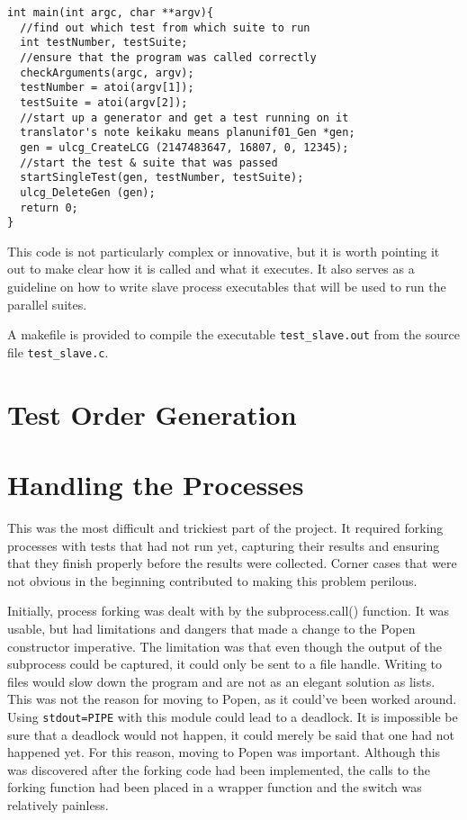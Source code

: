 \begin{verbatim}
int main(int argc, char **argv){
  //find out which test from which suite to run
  int testNumber, testSuite;
  //ensure that the program was called correctly
  checkArguments(argc, argv);
  testNumber = atoi(argv[1]);
  testSuite = atoi(argv[2]);
  //start up a generator and get a test running on it 
  translator's note keikaku means planunif01_Gen *gen;
  gen = ulcg_CreateLCG (2147483647, 16807, 0, 12345);
  //start the test & suite that was passed 
  startSingleTest(gen, testNumber, testSuite);
  ulcg_DeleteGen (gen);
  return 0;
}     
\end{verbatim}

This code is not particularly complex or innovative, but it is worth pointing it out to make clear how it is called and what it executes. It also serves as a guideline on how to write slave process executables that will be used to run the parallel suites.

A makefile is provided to compile the executable \texttt{test\_slave.out} from the source file \texttt{test\_slave.c}.

\section{Test Order Generation}

\section{Handling the Processes}
This was the most difficult and trickiest part of the project. It required forking processes with tests that had not run yet, capturing their results and ensuring that they finish properly before the results were collected. Corner cases that were not obvious in the beginning contributed to making this problem perilous. 

Initially, process forking was dealt with by the subprocess.call() function. It was usable, but had limitations and dangers that made a change to the Popen constructor imperative. The limitation was that even though the output of the subprocess could be captured, it could only be sent to a file handle. Writing to files would slow down the program and are not as an elegant solution as lists. This was not the reason for moving to Popen, as it could've been worked around. Using \texttt{stdout=PIPE} with this module could lead to a deadlock. It is impossible be sure that a deadlock would not happen, it could merely be said that one had not happened yet. For this reason, moving to Popen was important. Although this was discovered after the forking code had been implemented, the calls to the forking function had been placed in a wrapper function and the switch was relatively painless.

